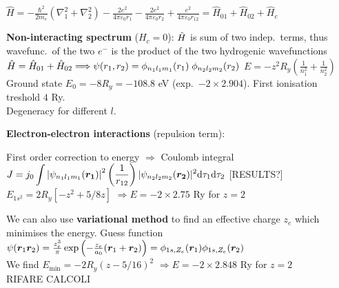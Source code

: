 \begin{squishlist}
    \item $\hat{H} = - \frac{\hbar^2}{2m_e}(\nabla^2_1 + \nabla^2_2) - \frac{2e^2}{4\pi \varepsilon_0 r_1} - \frac{2e^2}{4\pi \varepsilon_0 r_2} + \frac{e^2}{4\pi \varepsilon_0 r_{12}} = \hat{H}_{01} + \hat{H}_{02} + \hat{H}_c$
    \item \textbf{Non-interacting spectrum} ($H_c = 0$): $\hat{H}$ is sum of two indep.\ terms, thus wavefunc.\ of the two $e^-$ is the product of the two hydrogenic wavefunctions \\
    $ \hat{H} = \hat{H}_{01} + \hat{H}_{02} \Longrightarrow \psi(r_1,r_2) = \phi_{n_1 l_1 m_1}(r_1) \; \phi_{n_2 l_2 m_2}(r_2)$ \qquad $E = -z^2 R_y \left( \frac{1}{n_1^2}+ \frac{1}{n_2^2} \right)$ \\
    Ground state $E_0 = -8 R_y = -108.8$ eV (exp.\ $-2\times 2.904$). First ionisation treshold $4$ Ry. \\
    Degeneracy for different $l$.

    \item \textbf{Electron-electron interactions} (repulsion term):
    \begin{squishitemize}
        \item First order correction to energy $\Rightarrow$ Coulomb integral \\
        $ \displaystyle J = j_0 \int \left|\psi_{n_1 l_1 m_1}(\bm{r_1})\right|^2 \left(\frac{1}{r_{12}}\right) |\psi_{n_2 l_2 m_2}(\bm{r_2})|^2  \textrm{d} \tau_1 \textrm{d} \tau_2$ [RESULTS?] \\
        $E_{1s^2} = 2 R_y [-z^2 + 5/8 z]$ \qquad $\Longrightarrow E = -2\times 2.75$ Ry for $z=2$
        \item We can also use \textbf{variational method} to find an effective charge $z_e$ which minimises the energy. Guess function $\psi(\bm{r}_1 \bm{r}_2) = \frac{z_e^3}{\pi}\exp\left(-\frac{z_e}{a_0}(\bm{r}_1 + \bm{r}_2) \right) = \phi_{1s,Z_e}(\bm{r}_1)\phi_{1s,Z_e}(\bm{r}_2)$ \\
        We find $E_{\min} = -2 R_y (z - 5/16)^2$ \qquad $\Longrightarrow E = -2\times 2.848$ Ry for $z=2$ \\
        RIFARE CALCOLI 
    \end{squishitemize}


\end{squishlist}
